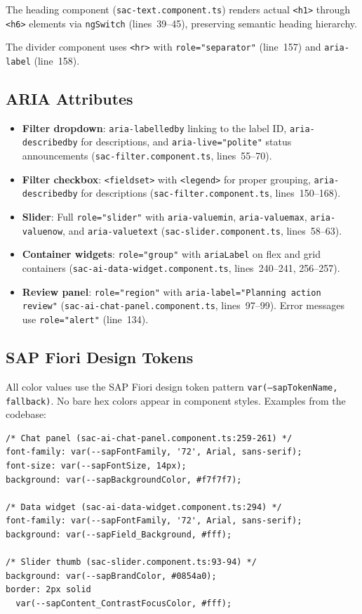 \documentclass[11pt]{article}
\begin{document}
\noindent The heading component (\texttt{sac-text.component.ts}) renders
actual \texttt{<h1>} through \texttt{<h6>} elements via \texttt{ngSwitch}
(lines~39--45), preserving semantic heading hierarchy.

The divider component uses \texttt{<hr>} with \texttt{role="separator"}
(line~157) and \texttt{aria-label} (line~158).

\subsection{ARIA Attributes}

\begin{itemize}
  \item \textbf{Filter dropdown}: \texttt{aria-labelledby} linking to the
    label ID, \texttt{aria-describedby} for descriptions, and
    \texttt{aria-live="polite"} status announcements
    (\texttt{sac-filter.component.ts}, lines~55--70).
  \item \textbf{Filter checkbox}: \texttt{<fieldset>} with \texttt{<legend>}
    for proper grouping, \texttt{aria-describedby} for descriptions
    (\texttt{sac-filter.component.ts}, lines~150--168).
  \item \textbf{Slider}: Full \texttt{role="slider"} with
    \texttt{aria-valuemin}, \texttt{aria-valuemax}, \texttt{aria-valuenow},
    and \texttt{aria-valuetext} (\texttt{sac-slider.component.ts},
    lines~58--63).
  \item \textbf{Container widgets}: \texttt{role="group"} with
    \texttt{ariaLabel} on flex and grid containers
    (\texttt{sac-ai-data-widget.component.ts}, lines~240--241, 256--257).
  \item \textbf{Review panel}: \texttt{role="region"} with
    \texttt{aria-label="Planning action review"}
    (\texttt{sac-ai-chat-panel.component.ts}, lines~97--99).
    Error messages use \texttt{role="alert"} (line~134).
\end{itemize}

\subsection{SAP Fiori Design Tokens}

All color values use the SAP Fiori design token pattern
\texttt{var(--sapTokenName, fallback)}. No bare hex colors appear in
component styles. Examples from the codebase:

\begin{lstlisting}[caption={Fiori design token usage examples}]
/* Chat panel (sac-ai-chat-panel.component.ts:259-261) */
font-family: var(--sapFontFamily, '72', Arial, sans-serif);
font-size: var(--sapFontSize, 14px);
background: var(--sapBackgroundColor, #f7f7f7);

/* Data widget (sac-ai-data-widget.component.ts:294) */
font-family: var(--sapFontFamily, '72', Arial, sans-serif);
background: var(--sapField_Background, #fff);

/* Slider thumb (sac-slider.component.ts:93-94) */
background: var(--sapBrandColor, #0854a0);
border: 2px solid
  var(--sapContent_ContrastFocusColor, #fff);
\end{lstlisting}
\end{document}
